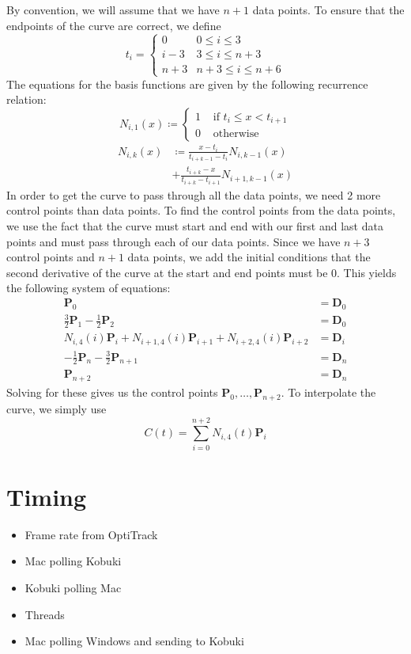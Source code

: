\documentclass[10pt]{article}
\begin{document}
\begin{multicols*}{2}
  By convention, we will assume that we have $n+1$ data points. To ensure that
  the endpoints of the curve are correct, we define \[t_i = \begin{cases}
      0 & 0 \le i \le 3 \\
      i-3 & 3 \le i \le n+3 \\
      n+3 & n+3 \le i \le n+6
    \end{cases}
  \]
  The equations for the basis functions are given by the following recurrence
  relation: \cite{wiki:spline}
  \[N_{i,1}(x) \coloneqq \begin{cases}
      1 &\text{ if } t_i \le x < t_{i+1} \\
      0 &\text{ otherwise}
  \end{cases} \]
  \begin{align*}
    N_{i,k}(x) &\coloneqq \frac{x-t_i}{t_{i+k-1}-t_i} N_{i,k-1}(x) \\
    &+ \frac{t_{i+k}-x}{t_{i+k}-t_{i+1}} N_{i+1,k-1}(x)
  \end{align*}
  In order to get the curve to pass through all the data points, we need 2 more
  control points than data points. To find the control points from the data
  points, we use the fact that the curve must start and end with our first and
  last data points and must pass through each of our data points. Since we have
  $n+3$ control points and $n+1$ data points, we add the initial conditions that
  the second derivative of the curve at the start and end points must be 0. This
  yields the following system of equations:
  \begin{align*}
    \mathbf{P}_0 &= \mathbf{D}_0 \\
    \frac{3}{2} \mathbf{P}_1 - \frac{1}{2} \mathbf{P}_2 &= \mathbf{D}_0 \\
    N_{i,4}(i) \mathbf{P}_i + N_{i+1,4}(i) \mathbf{P}_{i+1} + N_{i+2,4}(i)
    \mathbf{P}_{i+2} &= \mathbf{D}_i \\
    -\frac{1}{2} \mathbf{P}_{n} - \frac{3}{2} \mathbf{P}_{n+1} &= \mathbf{D}_n \\
    \mathbf{P}_{n+2} &= \mathbf{D}_{n}
  \end{align*}
  Solving for these gives us the control points $\mathbf{P}_0, \dots,
  \mathbf{P}_{n+2}$. To interpolate the curve, we simply use
  \[C(t) = \sum_{i=0}^{n+2} N_{i,4}(t) \mathbf{P}_i\]

  \section*{Timing}
  \begin{itemize}
    \item Frame rate from OptiTrack
    \item Mac polling Kobuki
    \item Kobuki polling Mac
    \item Threads
    \item Mac polling Windows and sending to Kobuki
  \end{itemize}


\end{multicols*}
\end{document}
